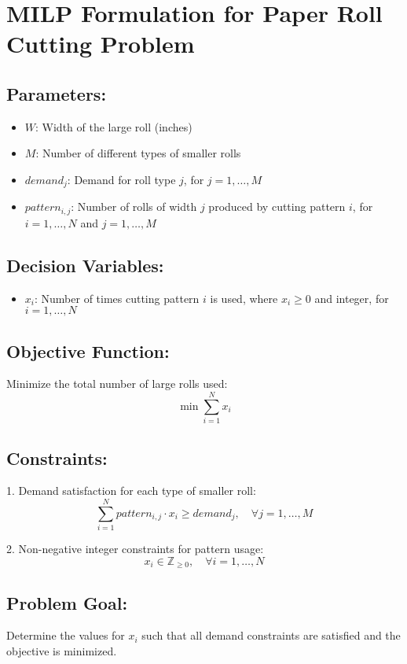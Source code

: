 \documentclass{article}
\begin{document}
\section*{MILP Formulation for Paper Roll Cutting Problem}

\subsection*{Parameters:}
\begin{itemize}
    \item $W$: Width of the large roll (inches)
    \item $M$: Number of different types of smaller rolls
    \item $demand_j$: Demand for roll type $j$, for $j = 1, \dots, M$
    \item $pattern_{i,j}$: Number of rolls of width $j$ produced by cutting pattern $i$,
    for $i = 1, \dots, N$ and $j = 1, \dots, M$
\end{itemize}

\subsection*{Decision Variables:}
\begin{itemize}
    \item $x_i$: Number of times cutting pattern $i$ is used, where $x_i \geq 0$ and integer, for $i = 1, \dots, N$
\end{itemize}

\subsection*{Objective Function:}
Minimize the total number of large rolls used:
\[
\min \sum_{i=1}^{N} x_i
\]

\subsection*{Constraints:}
1. Demand satisfaction for each type of smaller roll:
\[
\sum_{i=1}^{N} pattern_{i,j} \cdot x_i \geq demand_j, \quad \forall j = 1, \dots, M
\]

2. Non-negative integer constraints for pattern usage:
\[
x_i \in \mathbb{Z}_{\ge 0}, \quad \forall i = 1, \dots, N
\]

\subsection*{Problem Goal:}
Determine the values for $x_i$ such that all demand constraints are satisfied and the objective is minimized.
\end{document}
